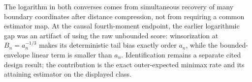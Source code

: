 The logarithm in both converses comes from simultaneous recovery of many boundary coordinates after distance compression, not from requiring a common estimator map.  At the causal fourth-moment endpoint, the earlier logarithmic gap was an artifact of using the raw unbounded score: winsorization at \(B_n=a_n^{-1/3}\) makes its deterministic tail bias exactly order \(a_n\), while the bounded-envelope linear term is smaller than \(a_n\).  Identification remains a separate cited design result; the contribution is the exact outer-expected minimax rate and its attaining estimator on the displayed class.